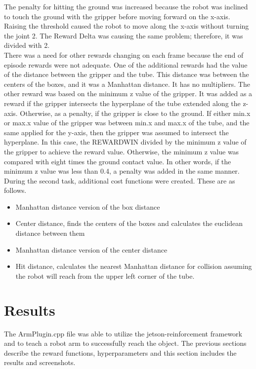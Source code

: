 \documentclass[10pt,journal,compsoc]{IEEEtran}
\begin{document}
The penalty for hitting the ground was increased because the robot was inclined to touch the ground with the gripper before moving forward on the x-axis. Raising the threshold caused the robot to move along the x-axis without turning the joint 2. The Reward Delta was causing the same problem; therefore, it was divided with 2.\\
There was a need for other rewards changing on each frame because the end of episode rewards were not adequate. One of the additional rewards had the value of the distance between the gripper and the tube. This distance was between the centers of the boxes, and it was a Manhattan distance. It has no multipliers. The other reward was based on the minimum z value of the gripper. It was added as a reward if the gripper intersects the hyperplane of the tube extended along the z-axis. Otherwise, as a penalty, if the gripper is close to the ground. If either min.x or max.x value of the gripper was between min.x and max.x of the tube, and the same applied for the y-axis, then the gripper was assumed to intersect the hyperplane. In this case, the REWARD\textunderscore WIN divided by the minimum z value of the gripper to achieve the reward value. Otherwise, the minimum z value was compared with eight times the ground contact value. In other words, if the minimum z value was less than 0.4, a penalty was added in the same manner.\\
During the second task, additional cost functions were created. These are as follows.
\begin{itemize}
\item Manhattan distance version of the box distance
\item Center distance, finds the centers of the boxes and calculates the euclidean distance between them
\item Manhattan distance version of the center distance
\item Hit distance, calculates the nearest Manhattan distance for collision assuming the robot will reach from the upper left corner of the tube.
\end{itemize}

\section{Results}
The ArmPlugin.cpp file was able to utilize the jetson-reinforcement framework and to teach a robot arm to successfully reach the object. The previous sections describe the reward functions, hyperparameters and this section includes the results and screenshots.
\end{document}
